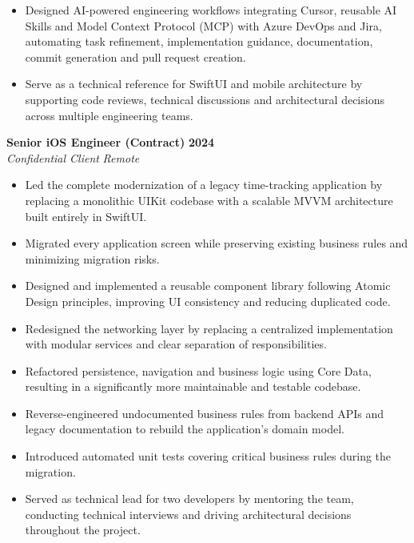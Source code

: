 \documentclass[10pt,a4paper]{article}
\newcommand{\job}[4]{%
\textbf{#1} \hfill \textbf{#2}\\
\textit{#3} \hfill \textit{#4}\\[-2pt]
}
\begin{document}
\begin{itemize}
\item Designed AI-powered engineering workflows integrating Cursor, reusable AI Skills and Model Context Protocol (MCP) with Azure DevOps and Jira, automating task refinement, implementation guidance, documentation, commit generation and pull request creation.

\item Serve as a technical reference for SwiftUI and mobile architecture by supporting code reviews, technical discussions and architectural decisions across multiple engineering teams.

\end{itemize}


\job{Senior iOS Engineer (Contract)}{2024}{Confidential Client}{Remote}

\begin{itemize}

\item Led the complete modernization of a legacy time-tracking application by replacing a monolithic UIKit codebase with a scalable MVVM architecture built entirely in SwiftUI.

\item Migrated every application screen while preserving existing business rules and minimizing migration risks.

\item Designed and implemented a reusable component library following Atomic Design principles, improving UI consistency and reducing duplicated code.

\item Redesigned the networking layer by replacing a centralized implementation with modular services and clear separation of responsibilities.

\item Refactored persistence, navigation and business logic using Core Data, resulting in a significantly more maintainable and testable codebase.

\item Reverse-engineered undocumented business rules from backend APIs and legacy documentation to rebuild the application's domain model.

\item Introduced automated unit tests covering critical business rules during the migration.

\item Served as technical lead for two developers by mentoring the team, conducting technical interviews and driving architectural decisions throughout the project.

\end{itemize}
\end{document}
